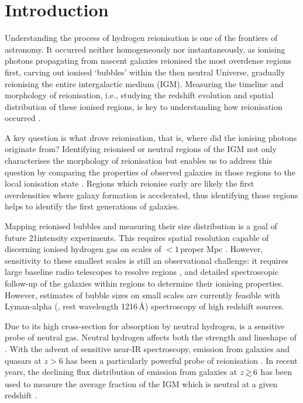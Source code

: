 \documentclass[fleqn,usenatbib]{mnras}
\begin{document}


\section{Introduction}
\label{sec:intro}

Understanding the process of hydrogen reionisation is one of the frontiers of astronomy. 
It occurred neither homogeneously nor instantaneously, as ionising photons propagating from nascent galaxies reionised the most overdense regions first, carving out ionised `bubbles' within the then neutral Universe, gradually reionising the entire intergalactic medium (IGM). Measuring the timeline and morphology of reionisation, i.e., studying the redshift evolution and spatial distribution of these ionised regions, is key to understanding how reionisation occurred \citep[e.g.,][]{Furlanetto2004a,McQuinn2007,Mesinger2016a}.

A key question is what drove reionisation, that is, where did the ionising photons originate from?
Identifying reionised or neutral regions of the IGM not only characterises the morphology of reionisation but enables us to address this question by comparing the properties of observed galaxies in those regions to the local ionisation state \citep[e.g.,][]{Beardsley2015a}. Regions which reionise early are likely the first overdensities where galaxy formation is accelerated, thus identifying those regions helps to identify the first generations of galaxies.

Mapping reionised bubbles and measuring their size distribution is a goal of future 21\cm intensity experiments. This requires spatial resolution capable of discerning ionised hydrogen gas on scales of $<1$\,proper Mpc \citep[e.g.,][]{Geil2017}. However, sensitivity to these smallest scales is still an observational challenge: it requires large baseline radio telescopes to resolve \HI regions \citep[e.g., SKA-low,][]{Koopmans2015}, and detailed spectroscopic follow-up of the galaxies within \HII regions to determine their ionising properties. However, estimates of bubble sizes on small scales are currently feasible with Lyman-alpha (\lya, rest wavelength 1216\,\AA) spectroscopy of high redshift sources.

Due to its high cross-section for absorption by neutral hydrogen, \lya is a sensitive probe of neutral gas. Neutral hydrogen affects both the strength and lineshape of \lya \citep[see, e.g.,][for a review]{Dijkstra2014}. With the advent of sensitive near-IR spectroscopy, \lya emission from galaxies and quasars at $z>6$ has been a particularly powerful probe of reionisation \citep[e.g.,][]{Malhotra2006,Fan2006,Dijkstra2011,Treu2013,Mesinger2015,Davies2018b,Mason2018,Greig2019}. In recent years, the declining flux distribution of \lya emission from galaxies at $z\simgt6$ has been used to measure the average fraction of the IGM which is neutral at a given redshift \citep{Schenker2014,Mason2018,Mason2019a,Hoag2019a,Whitler2019}.
\end{document}
